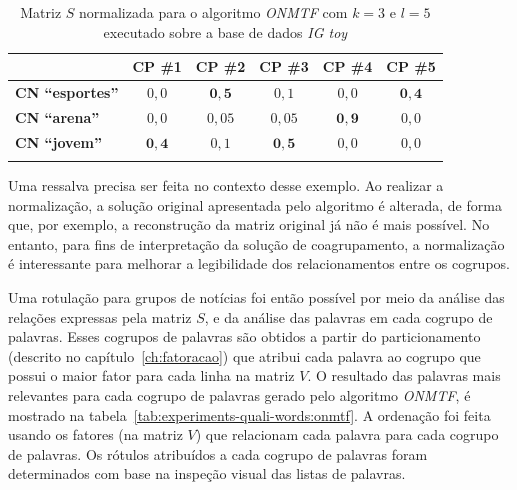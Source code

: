 \documentclass[
    12pt,                %
    oneside,            %
    a4paper,            %
    english,            %
    brazil                %
    ]{abntex2ppgsi}
\begin{document}
\begin{table}[H]
    \centering
    \caption{Matriz $S$ normalizada para o algoritmo \textit{ONMTF} com $k = 3$ e $l = 5$ executado sobre a base de dados \textit{IG toy}}
    \begin{tabular}{lccccc}
        \hline
         & \textbf{CP \#1} & \textbf{CP \#2} & \textbf{CP \#3} & \textbf{CP \#4} & \textbf{CP \#5} \\
        \hline
        \textbf{CN ``esportes''} & $0,0$ & $\mathbf{0,5}$  & $0,1$  & $0,0$ & $\mathbf{0,4}$ \\
        \textbf{CN ``arena''}    & $0,0$ & $0,05$ & $0,05$ & $\mathbf{0,9}$ & $0,0$ \\
        \textbf{CN ``jovem''}    & $\mathbf{0,4}$ & $0,1$  & $\mathbf{0,5}$  & $0,0$ & $0,0$ \\
        \hline \\
    \end{tabular}
    \label{tab:onmtf:matrizS}
\end{table}

Uma ressalva precisa ser feita no contexto desse exemplo. Ao realizar a normalização, a solução original apresentada pelo algoritmo é alterada, de forma que, por exemplo, a reconstrução da matriz original já não é mais possível. No entanto, para fins de interpretação da solução de coagrupamento, a normalização é interessante para melhorar a legibilidade dos relacionamentos entre os cogrupos.

Uma rotulação para grupos de notícias foi então possível por meio da análise das relações expressas pela matriz $S$, e da análise das palavras em cada cogrupo de palavras.
Esses cogrupos de palavras são obtidos a partir do particionamento (descrito no capítulo~\ref{ch:fatoracao}) que atribui cada palavra ao cogrupo que possui o maior fator para cada linha na matriz $V$. O resultado das palavras mais relevantes para cada cogrupo de palavras gerado pelo algoritmo \textit{ONMTF}, é mostrado na tabela~\ref{tab:experiments-quali-words:onmtf}. A ordenação foi feita usando os fatores (na matriz $V$) que relacionam cada palavra para cada cogrupo de palavras. Os rótulos atribuídos a cada cogrupo de palavras foram determinados com base na inspeção visual das listas de palavras.
\end{document}
